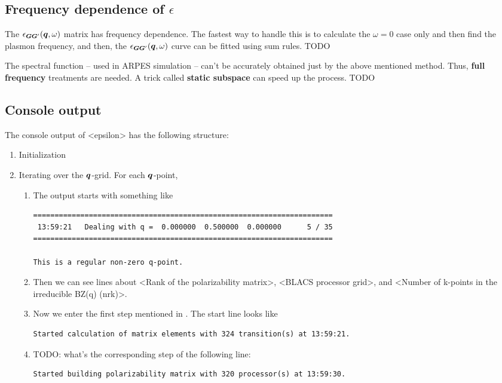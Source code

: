 \documentclass[hyperref, a4paper, 12pt]{report}
\newcommand*{\concept}[1]{{\textbf{#1}}}
\def\texttt#1{<#1>}%
\newcommand{\shortcode}[1]{\texttt{#1}}
\begin{document}
\subsection{Frequency dependence of $\epsilon$}

The $\epsilon_{\vb*{G} \vb*{G}'}(\vb*{q}, \omega)$ matrix has frequency dependence.
The fastest way to handle this is to calculate the $\omega = 0$ case only 
and then find the plasmon frequency,
and then, the $\epsilon_{\vb*{G} \vb*{G}'}(\vb*{q}, \omega)$ curve 
can be fitted using sum rules. TODO 

The spectral function -- used in ARPES simulation -- 
can't be accurately obtained just by the above mentioned method.
Thus, \concept{full frequency} treatments are needed.
A trick called \concept{static subspace} can speed up the process. TODO

\subsection{Console output}

The console output of \shortcode{epsilon} has the following structure:
\begin{enumerate}
    \item Initialization
    \item Iterating over the $\vb*{q}$-grid. For each $\vb*{q}$-point,
    \begin{enumerate}
        \item  The output starts with something like
        \begin{lstlisting}
====================================================================== 
 13:59:21   Dealing with q =  0.000000  0.500000  0.000000      5 / 35
======================================================================

This is a regular non-zero q-point.
        \end{lstlisting}
        \item Then we can see lines about 
        \shortcode{Rank of the polarizability matrix},
        \shortcode{BLACS processor grid},
        and \shortcode{Number of k-points in the irreducible BZ(q) (nrk)}.
        \item Now we enter the first step mentioned in .
        The start line looks like
        \begin{lstlisting}
Started calculation of matrix elements with 324 transition(s) at 13:59:21.
        \end{lstlisting}
        \item TODO: what's the corresponding step of the following line:
        \begin{lstlisting}
Started building polarizability matrix with 320 processor(s) at 13:59:30.
        \end{lstlisting}
    \end{enumerate}
\end{enumerate}
\end{document}
